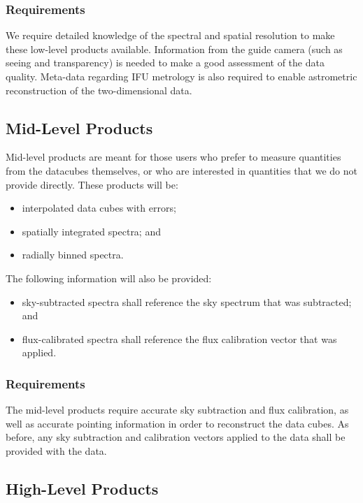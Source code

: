 \documentclass[preprint,11pt]{aastex}
\begin{document}
\subsubsection{Requirements}

We require detailed knowledge of the spectral and spatial resolution
to make these low-level products available. Information from the guide
camera (such as seeing and transparency) is needed to make a good
assessment of the data quality. Meta-data regarding IFU metrology is
also required to enable astrometric reconstruction of the
two-dimensional data.

\subsection{Mid-Level Products} \label{sec:mid_level_products}

Mid-level products are meant for those users who prefer to measure
quantities from the datacubes themselves, or who are interested in
quantities that we do not provide directly. These products will be:

\begin{itemize}
  \item interpolated data cubes with errors;
  \item spatially integrated spectra; and
  \item radially binned spectra.
\end{itemize}

The following information will also be provided:

\begin{itemize}
  \item sky-subtracted spectra shall reference the sky spectrum that
    was subtracted; and
  \item flux-calibrated spectra shall reference the flux calibration
    vector that was applied.
\end{itemize}

\subsubsection{Requirements}

The mid-level products require accurate sky subtraction and flux
calibration, as well as accurate pointing information in order to
reconstruct the data cubes. As before, any sky subtraction and
calibration vectors applied to the data shall be provided with the
data.

\subsection{High-Level Products} \label{sec:high_level_products}
\end{document}
